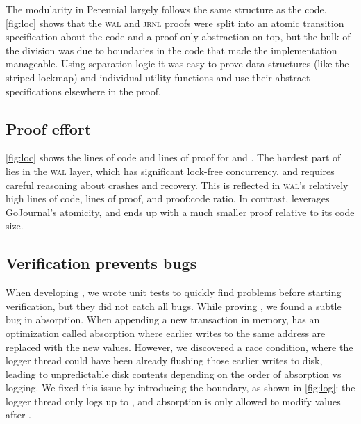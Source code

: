 The modularity in Perennial largely follows the same structure as the code.
\autoref{fig:loc} shows that the \textsc{wal} and \textsc{jrnl} proofs were
split into an atomic transition specification about the code and a proof-only
abstraction on top, but the bulk of the division was due to boundaries in the
code that made the implementation manageable. Using separation logic it was easy
to prove data structures (like the striped lockmap) and individual utility
functions and use their abstract specifications elsewhere in the proof.

\subsection{Proof effort}
\label{sec:eval:proof}

\autoref{fig:loc} shows the lines of code and lines of proof for \txn
and \simplenfs.  The hardest part of \txn lies in the \textsc{wal}
layer, which has significant lock-free concurrency, and requires careful
reasoning about crashes and recovery.  This is reflected in \textsc{wal}'s
relatively high lines of code, lines of proof, and proof:code ratio.
In contrast,
\simplenfs leverages GoJournal's atomicity, and ends up with a
much smaller proof relative to its code size.


\subsection{Verification prevents bugs}
\label{sec:eval:bugs}


When developing \txn, we wrote unit tests to quickly find problems before starting
verification, but they did not catch all bugs. While proving
\txn, we found a subtle bug in absorption.  When appending a new
transaction in memory, \txn has an optimization called absorption where earlier
writes to the same address are replaced with the new values. However, we discovered a race condition,
where the logger thread could have been already flushing those earlier
writes to disk, leading to unpredictable disk contents depending on the
order of absorption vs logging.  We fixed this issue by introducing the
 boundary, as shown in \autoref{fig:log}: the logger thread only
logs up to , and absorption is only allowed to modify values
after .


